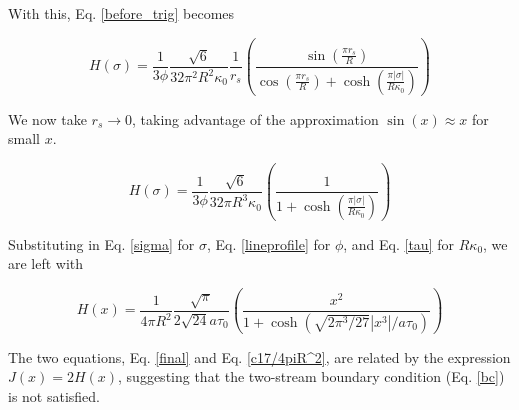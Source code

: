 \documentclass[onecolumn]{aastex63}
\begin{document}
With this, Eq. \ref{before_trig} becomes

\begin{equation} \label{after_trig}
    H(\sigma) = \frac{1}{3 \phi} \frac{\sqrt{6}}{32 \pi^2 R^2 \kappa_0} \frac{1}{r_s} \left(\frac{\sin{\left(\frac{\pi r_s}{R}\right)}}{\cos{\left(\frac{\pi r_s}{R}\right)} + \cosh{\left(\frac{\pi |\sigma|}{R\kappa_0}\right)}}\right)
\end{equation}

We now take $r_s \rightarrow 0$, taking advantage of the approximation $\sin(x) \approx x$ for small $x$.

\begin{equation}
    H(\sigma) = \frac{1}{3 \phi} \frac{\sqrt{6}}{32 \pi R^3 \kappa_0} \left(\frac{1}{1 + \cosh{\left(\frac{\pi |\sigma|}{R\kappa_0}\right)}}\right)
\end{equation}

Substituting in Eq. \ref{sigma} for $\sigma$, Eq. \ref{lineprofile} for $\phi$, and Eq. \ref{tau} for $R \kappa_0$, we are left with

\begin{equation} \label{final}
    H(x) = \frac{1}{4\pi R^2}\frac{\sqrt{\pi}}{2\sqrt{24}a\tau_0} \left(\frac{x^2}{1 + \cosh{\left(\sqrt{2\pi^3/27}|x^3|/a\tau_0\right)}}\right)
\end{equation}

The two equations, Eq. \ref{final} and Eq. \ref{c17/4piR^2}, are related by the expression $J(x) = 2 H(x)$, suggesting that the two-stream boundary condition (Eq. \ref{bc}) is not satisfied.

{}

\end{document}
